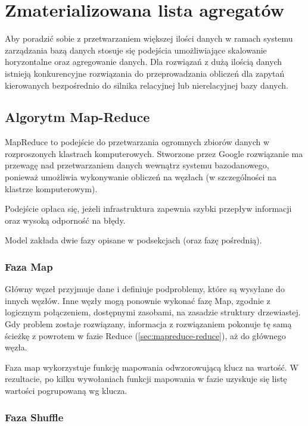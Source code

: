 \section{Zmaterializowana lista agregatów}

Aby poradzić sobie z przetwarzaniem większej ilości danych w ramach systemu zarządzania bazą danych stosuje się podejścia umożliwiające skalowanie horyzontalne oraz agregowanie danych. Dla rozwiązań z dużą ilością danych istnieją konkurencyjne rozwiązania do przeprowadzania obliczeń dla zapytań kierowanych bezpośrednio do silnika relacyjnej lub nierelacyjnej bazy danych.

\subsection{Algorytm Map-Reduce}
\label{sec:mapreduce}

MapReduce to podejście do przetwarzania ogromnych zbiorów danych w rozproszonych klastrach komputerowych\cite{google-map-reduce}. Stworzone przez Google rozwiązanie ma przewagę nad przetwarzaniem danych wewnątrz systemu bazodanowego, ponieważ umożliwia wykonywanie obliczeń na węzłach (w szczególności na klastrze komputerowym).

Podejście opłaca się, jeżeli infrastruktura zapewnia szybki przepływ informacji oraz wysoką odporność na błędy.

Model zakłada dwie fazy opisane w podsekcjach (oraz fazę pośrednią).

\subsubsection{Faza Map}
\label{sec:mapreduce-map}

Główny węzeł przyjmuje dane i definiuje podproblemy, które są wysyłane do innych węzłów. Inne węzły mogą ponownie wykonać fazę Map, zgodnie z logicznym połączeniem, dostępnymi zasobami, na zasadzie struktury drzewiastej. Gdy problem zostaje rozwiązany, informacja z rozwiązaniem pokonuje tę samą ścieżkę z powrotem w fazie Reduce (\ref{sec:mapreduce-reduce}), aż do głównego węzła.

Faza map wykorzystuje funkcję mapowania odwzorowującą klucz na wartość. W rezultacie, po kilku wywołaniach funkcji mapowania w fazie uzyskuje się listę wartości pogrupowaną wg klucza.

\subsubsection{Faza Shuffle}
\label{sec:mapreduce-shuffle}

